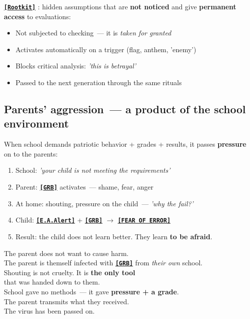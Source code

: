 \documentclass[13pt,a4paper]{article}
\newcommand{\termr}[1]{%
  \hyperref[glossary:#1]{\textbf{\texttt{\textcolor{sce-blue}{[#1]}}}}%
}
\newcommand{\kav}[1]{\textcolor{sce-red}{'#1'}}
\newenvironment{dialogbox}[1]{%
  \vspace{0.9em}
  \begin{mdframed}[
    linecolor=sce-gold, linewidth=4pt,
    topline=false, rightline=false, bottomline=false,
    backgroundcolor=bg-gold,
    innerleftmargin=12pt, innerrightmargin=10pt,
    innertopmargin=8pt, innerbottommargin=8pt,
    skipabove=0pt, skipbelow=0pt
  ]
  \noindent{\montserrat\normalsize\bfseries\color{sce-gold}#1}\par\vspace{4pt}%
  \ignorespaces
}{%
  \end{mdframed}
  \vspace{0.6em}
}
\begin{document}
\termr{Rootkit}: hidden assumptions that are \textbf{not noticed} and give \textbf{permanent
access} to evaluations:
\begin{itemize}
  \item Not subjected to checking~--- it is \textit{taken for granted}
  \item Activates automatically on a trigger (flag, anthem, \kav{enemy})
  \item Blocks critical analysis: \textit{\kav{this is betrayal}}
  \item Passed to the next generation through the same rituals
\end{itemize}

\subsection{Parents' aggression~--- a product of the school environment}

When school demands patriotic behavior + grades + results,
it passes \textbf{pressure} on to the parents:

\begin{enumerate}
  \item School: \textit{\kav{your child is not meeting the requirements}}
  \item Parent: \termr{GRB} activates~--- shame, fear, anger
  \item At home: shouting, pressure on the child~--- \textit{\kav{why the fail?}}
  \item Child: \termr{E.A.Alert} + \termr{GRB} $\to$ \termr{FEAR OF ERROR}
  \item Result: the child does not learn better. They learn \textbf{to be afraid}.
\end{enumerate}

\begin{dialogbox}{Key observation}
The parent does not want to cause harm.\\
The parent is themself infected with \termr{GRB} from \textit{their own} school.\\
Shouting is not cruelty. It is \textbf{the only tool}\\
that was handed down to them.\\[0.3em]
School gave no methods~--- it gave \textbf{pressure + a grade}.\\
The parent transmits what they received.\\[0.3em]
The virus has been passed on.
\end{dialogbox}
\end{document}
